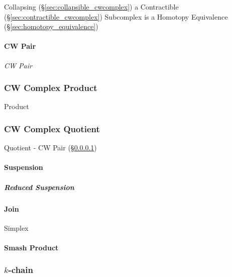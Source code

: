 Collapsing (\S\ref{sec:collapsible_cwcomplex}) a Contractible
(\S\ref{sec:contractible_cwcomplex}) Subcomplex is a Homotopy
Equivalence (\S\ref{sec:homotopy_equivalence})



\paragraph{CW Pair}\label{sec:cw_pair}\hfill

\emph{CW Pair}



\subsubsection{CW Complex Product}\label{sec:cwcomplex_product}

Product



\subsubsection{CW Complex Quotient}\label{sec:cwcomplex_quotient}

Quotient - CW Pair (\S\ref{sec:cw_pair})



\paragraph{Suspension}\label{sec:suspension}\hfill

\subparagraph{Reduced Suspension}\label{sec:reduced_suspension}\hfill



\paragraph{Join}\label{sec:join}\hfill

Simplex %



\paragraph{Smash Product}\label{sec:smash_product}\hfill



\subsubsection{$k$-chain}\label{sec:k_chain}

